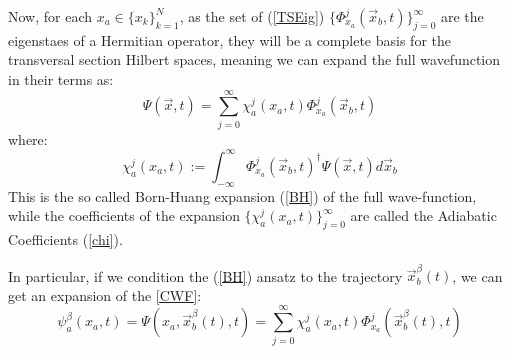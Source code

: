 \documentclass[11pt, a4paper]{article} %
\begin{document}
Now, for each $x_a\in\{x_k\}_{k=1}^N$, as the set of (\ref{TSEig}) $\{\Phi_{x_a}^j(\vec{x}_b,t)\}_{j=0}^\infty$ are the eigenstaes of a Hermitian operator, they will be a complete basis for the transversal section Hilbert spaces, meaning we can expand the full wavefunction in their terms as:
\begin{equation}\label{BH}\tag{BH}
\Psi(\vec{x},t)=\sum_{j=0}^\infty \chi_a^j(x_a,t) \Phi_{x_a}^j(\vec{x}_b,t)
\end{equation}
where:
\begin{equation}\label{chi}\tag{chi}
\chi_a^j(x_a,t):= \int_{-\infty}^\infty \Phi_{x_a}^j(\vec{x}_b,t)^\dagger \Psi(\vec{x},t) d\vec{x}_b
\end{equation}
This is the so called Born-Huang expansion (\ref{BH}) of the full wave-function, while the coefficients of the expansion $\{\chi_a^j(x_a,t)\}_{j=0}^\infty$ are called the Adiabatic Coefficients (\ref{chi}).

In particular, if we condition the (\ref{BH}) ansatz to the trajectory $\vec{x}_b^\beta(t)$, we can get an expansion of the \ref{CWF}:
$$
\psi_a^\beta(x_a,t) = \Psi(x_a, \vec{x}_b^\beta(t), t) = \sum_{j=0}^\infty \chi_a^j(x_a,t) \Phi_{x_a}^j(\vec{x}_b^\beta(t),t)
$$
\end{document}

